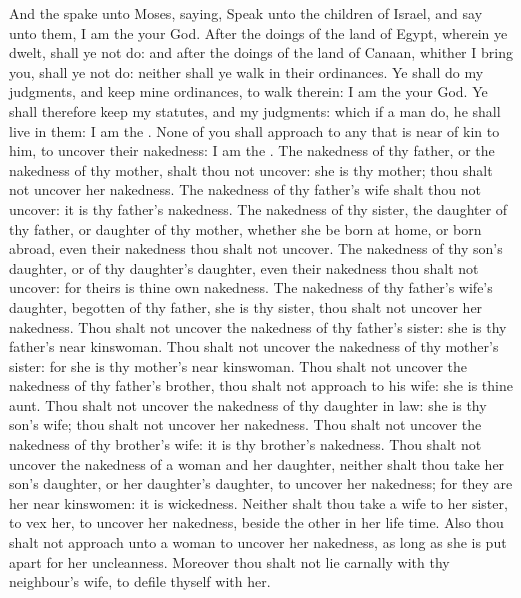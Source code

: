 \begin{biblechapter} %
 And the \LORD spake unto Moses, saying,
\verse Speak unto the children of Israel, and say unto them, I am the \LORD your God.
\verse After the doings of the land of Egypt, wherein ye dwelt, shall ye not do: and after the doings of the land of Canaan, whither I bring you, shall ye not do: neither shall ye walk in their ordinances.
\verse Ye shall do my judgments, and keep mine ordinances, to walk therein: I am the \LORD your God.
\verse Ye shall therefore keep my statutes, and my judgments: which if a man do, he shall live in them: I am the \LORD.
\verse None of you shall approach to any that is near of kin to him, to uncover their nakedness: I am the \LORD.
\verse The nakedness of thy father, or the nakedness of thy mother, shalt thou not uncover: she is thy mother; thou shalt not uncover her nakedness.
\verse The nakedness of thy father's wife shalt thou not uncover: it is thy father's nakedness.
\verse The nakedness of thy sister, the daughter of thy father, or daughter of thy mother, whether she be born at home, or born abroad, even their nakedness thou shalt not uncover.
\verse The nakedness of thy son's daughter, or of thy daughter's daughter, even their nakedness thou shalt not uncover: for theirs is thine own nakedness.
\verse The nakedness of thy father's wife's daughter, begotten of thy father, she is thy sister, thou shalt not uncover her nakedness.
\verse Thou shalt not uncover the nakedness of thy father's sister: she is thy father's near kinswoman.
\verse Thou shalt not uncover the nakedness of thy mother's sister: for she is thy mother's near kinswoman.
\verse Thou shalt not uncover the nakedness of thy father's brother, thou shalt not approach to his wife: she is thine aunt.
\verse Thou shalt not uncover the nakedness of thy daughter in law: she is thy son's wife; thou shalt not uncover her nakedness.
\verse Thou shalt not uncover the nakedness of thy brother's wife: it is thy brother's nakedness.
\verse Thou shalt not uncover the nakedness of a woman and her daughter, neither shalt thou take her son's daughter, or her daughter's daughter, to uncover her nakedness; for they are her near kinswomen: it is wickedness.
\verse Neither shalt thou take a wife to her sister, to vex her, to uncover her nakedness, beside the other in her life time.
\verse Also thou shalt not approach unto a woman to uncover her nakedness, as long as she is put apart for her uncleanness.
\verse Moreover thou shalt not lie carnally with thy neighbour's wife, to defile thyself with her.

\end{biblechapter}
